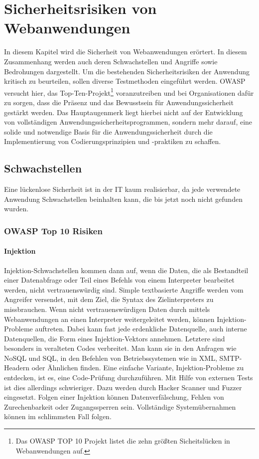 \chapter{Sicherheitsrisiken von Webanwendungen}
\label{cha:k3}

In diesem Kapitel wird die Sicherheit von Webanwendungen erörtert. In diesem Zusammenhang werden auch deren Schwachstellen und Angriffe sowie Bedrohungen dargestellt. Um die bestehenden Sicherheitsrisiken der Anwendung kritisch zu beurteilen, sollen diverse Testmethoden eingeführt werden. OWASP versucht hier, das Top-Ten-Projekt\footnote{Das OWASP TOP 10 Projekt listet die zehn größten Sicheitslücken in Webanwendungen auf.} voranzutreiben und bei Organisationen dafür zu sorgen, dass die Präsenz und das Bewusstsein für Anwendungssicherheit gestärkt werden. Das Hauptaugenmerk liegt hierbei nicht auf der Entwicklung von vollständigen Anwendungssicherheitsprogrammen, sondern mehr darauf, eine solide und notwendige Basis für die Anwendungssicherheit durch die Implementierung von Codierungsprinzipien und -praktiken zu schaffen.

\section{Schwachstellen}

Eine lückenlose Sicherheit ist in der IT kaum realisierbar, da jede verwendete Anwendung Schwachstellen beinhalten kann, die bis jetzt noch nicht gefunden wurden.

\subsection{OWASP Top 10 Risiken}

\subsubsection{Injektion}

Injektion-Schwachstellen kommen dann auf, wenn die Daten, die als Bestandteil einer Datenabfrage oder Teil eines Befehls von einem Interpreter bearbeitet werden, nicht vertrauenswürdig sind. Simple textbasierte Angriffe werden vom Angreifer versendet, mit dem Ziel, die Syntax des Zielinterpreters zu missbrauchen. Wenn nicht vertrauenswürdigen Daten durch mittels Webanwendungen an einen Interpreter weitergeleitet werden, können Injektion-Probleme auftreten. Dabei kann fast jede erdenkliche Datenquelle, auch interne Datenquellen, die Form eines Injektion-Vektors annehmen. Letztere sind besonders in veralteten Codes verbreitet. Man kann sie in den Anfragen wie NoSQL und SQL, in den Befehlen von Betriebssystemen wie in XML, SMTP-Headern oder Ähnlichen finden. Eine einfache Variante, Injektion-Probleme zu entdecken, ist es, eine Code-Prüfung durchzuführen. Mit Hilfe von externen Tests ist dies allerdings schwieriger. Dazu werden durch Hacker Scanner und Fuzzer eingesetzt. Folgen einer Injektion können Datenverfälschung, Fehlen von Zurechenbarkeit oder Zugangssperren sein. Vollständige Systemübernahmen können im schlimmsten Fall folgen\cite{owasp13top10}.\\

